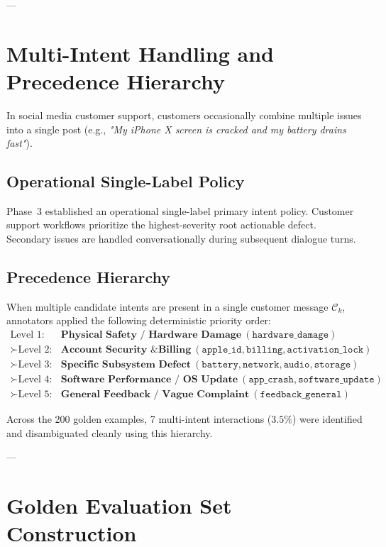 \documentclass[11pt,a4paper]{article}
\begin{document}
---

\section{Multi-Intent Handling and Precedence Hierarchy}

In social media customer support, customers occasionally combine multiple issues into a single post (e.g., \textit{"My iPhone X screen is cracked and my battery drains fast"}). 

\subsection{Operational Single-Label Policy}
Phase~3 established an operational single-label primary intent policy. Customer support workflows prioritize the highest-severity root actionable defect. Secondary issues are handled conversationally during subsequent dialogue turns.

\subsection{Precedence Hierarchy}
When multiple candidate intents are present in a single customer message $\mathcal{C}_k$, annotators applied the following deterministic priority order:
\begin{equation}
\boxed{
\begin{aligned}
\text{Level 1: } & \textbf{Physical Safety / Hardware Damage} \ (\texttt{hardware\_damage}) \\
\succ \text{Level 2: } & \textbf{Account Security \& Billing} \ (\texttt{apple\_id}, \texttt{billing}, \texttt{activation\_lock}) \\
\succ \text{Level 3: } & \textbf{Specific Subsystem Defect} \ (\texttt{battery}, \texttt{network}, \texttt{audio}, \texttt{storage}) \\
\succ \text{Level 4: } & \textbf{Software Performance / OS Update} \ (\texttt{app\_crash}, \texttt{software\_update}) \\
\succ \text{Level 5: } & \textbf{General Feedback / Vague Complaint} \ (\texttt{feedback\_general})
\end{aligned}
}
\end{equation}

Across the 200 golden examples, 7 multi-intent interactions ($3.5\%$) were identified and disambiguated cleanly using this hierarchy.

---

\section{Golden Evaluation Set Construction}
\end{document}
